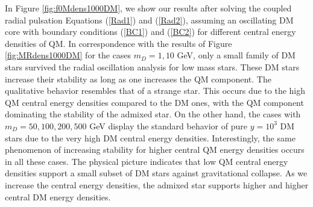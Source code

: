\documentclass[universe,article,accept,moreauthors,pdftex]{Definitions/mdpi}
\begin{document}


In Figure \ref{fig:f0Mdens1000DM}, we show our results after solving the coupled radial pulsation Equations (\ref{Rad1}) and (\ref{Rad2}), assuming an oscillating DM core with boundary conditions (\ref{BC1}) and (\ref{BC2}) for different central energy densities of QM. In correspondence with the results of Figure \ref{fig:MRdens1000DM} for the cases $m_{D}=1,10$ GeV, only a small family of DM stars survived the radial oscillation analysis for low mass stars. These DM stars increase their stability as long as one increases the QM component. The qualitative behavior resembles that of a strange star. This occurs due to the high QM central energy densities compared to the DM ones, with the QM component dominating the stability of the admixed star. On the other hand, the cases with $m_{D}=50, 100, 200, 500$ GeV display the standard behavior of pure $y=10^{3}$ DM stars due to the very high DM central energy densities. Interestingly, the same phenomenon of increasing stability for higher central QM energy densities occurs in all these cases. The physical picture indicates that low QM central energy densities support a small subset of DM stars against gravitational collapse. As we increase the central energy densities, the admixed star supports higher and higher central DM energy densities. 
\end{document}
